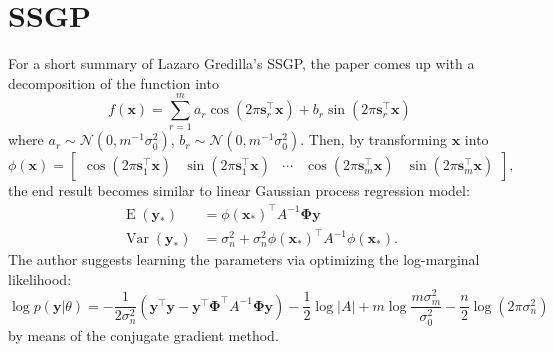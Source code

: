 \documentclass[11pt]{article}
\newcommand{\opn}{\operatorname}
\begin{document}
\section{SSGP}
  For a short summary of Lazaro Gredilla's SSGP, the paper comes up with a decomposition of the function into
  \begin{equation}
    f\left(\mathbf{x}\right) = \sum_{r=1}^{m}a_{r}\cos\left(2\pi \mathbf{s}_{r}^{\top}\mathbf{x}\right) + b_{r}\sin\left(2\pi\mathbf{s}_{r}^{\top}\mathbf{x}\right)
  \end{equation}
  where $a_{r}\sim \mathcal{N}\left(0, m^{-1}\sigma_{0}^{2}\right)$, $b_{r} \sim \mathcal{N}\left(0,m^{-1}\sigma_{0}^{2}\right)$. Then, by transforming $\mathbf{x}$ into
  \begin{equation}
    \phi\left(\mathbf{x}\right) = \begin{bmatrix} \cos\left(2\pi\mathbf{s}_{1}^{\top}\mathbf{x}\right) & \sin\left(2\pi\mathbf{s}_{1}^{\top}\mathbf{x}\right) & \cdots & \cos\left(2\pi\mathbf{s}_{m}^{\top}\mathbf{x}\right) & \sin\left(2\pi\mathbf{s}_{m}^{\top}\mathbf{x}\right) \end{bmatrix},
  \end{equation}
  the end result becomes similar to linear Gaussian process regression model:
  \begin{align}
    \opn{E}\left(\mathbf{y}_{*}\right) &= \phi\left(\mathbf{x}_{*}\right)^{\top}A^{-1}\mathbf{\Phi}\mathbf{y}\\
    \opn{Var}\left(\mathbf{y}_{*}\right) &= \sigma_{n}^{2}+\sigma_{n}^{2}\phi\left(\mathbf{x}_{*}\right)^{\top}A^{-1}\phi\left(\mathbf{x}_{*}\right).
  \end{align}
  The author suggests learning the parameters via optimizing the log-marginal likelihood:
  \begin{equation}
    \log p\left(\mathbf{y}|\theta\right) = -\frac{1}{2\sigma_{n}^{2}}\left(\mathbf{y}^{\top}\mathbf{y}-\mathbf{y}^{\top}\mathbf{\Phi}^{\top}A^{-1}\mathbf{\Phi y}\right)-\frac{1}{2}\log \left|A\right| +m\log\frac{m\sigma_{m}^{2}}{\sigma_{0}^{2}}-\frac{n}{2}\log\left(2\pi\sigma_{n}^{2}\right)
  \end{equation}
  by means of the conjugate gradient method.
\end{document}
